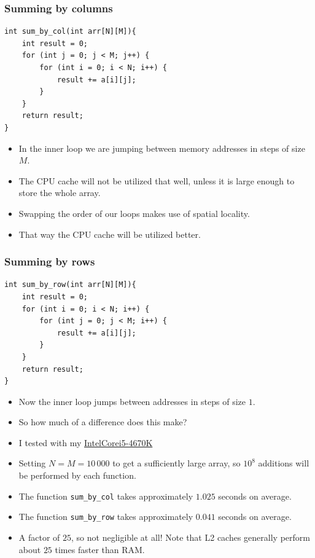 \documentclass{beamer}
\begin{document}
\begin{frame}
    \frametitle{Summing by columns}
    \begin{scriptsize}
        \begin{verbatim}
int sum_by_col(int arr[N][M]){
    int result = 0;
    for (int j = 0; j < M; j++) {
        for (int i = 0; i < N; i++) {
            result += a[i][j];
        }
    }
    return result;
}
        \end{verbatim}
    \end{scriptsize}
    \begin{itemize}
        \item<2-> In the inner loop we are jumping between memory addresses in steps of size $M$.
        \item<3-> The CPU cache will not be utilized that well, unless it is large enough to store the whole array.
        \item<4-> Swapping the order of our loops makes use of spatial locality.
        \item<5-> That way the CPU cache will be utilized better.
    \end{itemize}
\end{frame}

\begin{frame}
    \frametitle{Summing by rows}
    \begin{scriptsize}
        \begin{verbatim}
int sum_by_row(int arr[N][M]){
    int result = 0;
    for (int i = 0; i < N; i++) {
        for (int j = 0; j < M; i++) {
            result += a[i][j];
        }
    }
    return result;
}
        \end{verbatim}
    \end{scriptsize}
    \begin{itemize}
        \item<2-> Now the inner loop jumps between addresses in steps of size $1$.
        \item<3-> So how much of a difference does this make?
        \item<4-> I tested with my \href{https://www.intel.com/content/www/us/en/products/sku/75048/intel-core-i54670k-processor-6m-cache-up-to-3-80-ghz/specifications.html}{Intel\textregistered Core\texttrademark i5-4670K}
        \item<5-> Setting $N = M = 10\,000$ to get a sufficiently large array, so $10^8$ additions will be performed by each function.
        \item<6-> The function \texttt{sum\_by\_col} takes approximately $1.025$ seconds on average.
        \item<7-> The function \texttt{sum\_by\_row} takes approximately $0.041$ seconds on average.
        \item<8-> A factor of $25$, so not negligible at all! Note that L2 caches generally perform about $25$ times faster than RAM.
    \end{itemize}
\end{frame}
\end{document}
